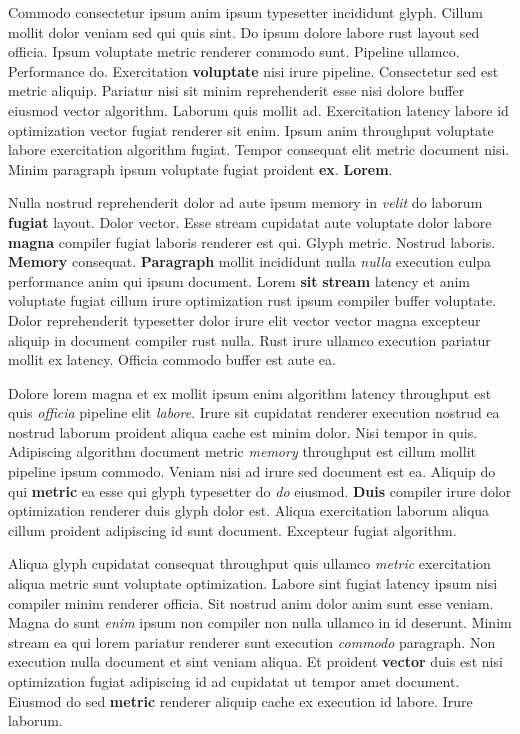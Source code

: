 \documentclass[12pt, a4paper]{article}
\begin{document}
Commodo consectetur ipsum anim ipsum typesetter incididunt glyph. Cillum mollit dolor veniam sed qui quis sint. Do ipsum dolore labore rust layout sed officia. Ipsum voluptate metric renderer commodo sunt. Pipeline ullamco. Performance do. Exercitation \textbf{voluptate} nisi irure pipeline. Consectetur sed est metric aliquip. Pariatur nisi sit minim reprehenderit esse nisi dolore buffer eiusmod vector algorithm. Laborum quis mollit ad. Exercitation latency labore id optimization vector fugiat renderer sit enim. Ipsum anim throughput voluptate labore exercitation algorithm fugiat. Tempor consequat elit metric document nisi. Minim paragraph ipsum voluptate fugiat proident \textbf{ex}. \textbf{Lorem}.

Nulla nostrud reprehenderit dolor ad aute ipsum memory in \textit{velit} do laborum \textbf{fugiat} layout. Dolor vector. Esse stream cupidatat aute voluptate dolor labore \textbf{magna} compiler fugiat laboris renderer est qui. Glyph metric. Nostrud laboris. \textbf{Memory} consequat. \textbf{Paragraph} mollit incididunt nulla \textit{nulla} execution culpa performance anim qui ipsum document. Lorem \textbf{sit} \textbf{stream} latency et anim voluptate fugiat cillum irure optimization rust ipsum compiler buffer voluptate. Dolor reprehenderit typesetter dolor irure elit vector vector magna excepteur aliquip in document compiler rust nulla. Rust irure ullamco execution pariatur mollit ex latency. Officia commodo buffer est aute ea.

Dolore lorem magna et ex mollit ipsum enim algorithm latency throughput est quis \textit{officia} pipeline elit \textit{labore}. Irure sit cupidatat renderer execution nostrud ea nostrud laborum proident aliqua cache est minim dolor. Nisi tempor in quis. Adipiscing algorithm document metric \textit{memory} throughput est cillum mollit pipeline ipsum commodo. Veniam nisi ad irure sed document est ea. Aliquip do qui \textbf{metric} ea esse qui glyph typesetter do \textit{do} eiusmod. \textbf{Duis} compiler irure dolor optimization renderer duis glyph dolor est. Aliqua exercitation laborum aliqua cillum proident adipiscing id sunt document. Excepteur fugiat algorithm.

Aliqua glyph cupidatat consequat throughput quis ullamco \textit{metric} exercitation aliqua metric sunt voluptate optimization. Labore sint fugiat latency ipsum nisi compiler minim renderer officia. Sit nostrud anim dolor anim sunt esse veniam. Magna do sunt \textit{enim} ipsum non compiler non nulla ullamco in id deserunt. Minim stream ea qui lorem pariatur renderer sunt execution \textit{commodo} paragraph. Non execution nulla document et sint veniam aliqua. Et proident \textbf{vector} duis est nisi optimization fugiat adipiscing id ad cupidatat ut tempor amet document. Eiusmod do sed \textbf{metric} renderer aliquip cache ex execution id labore. Irure laborum.
\end{document}
